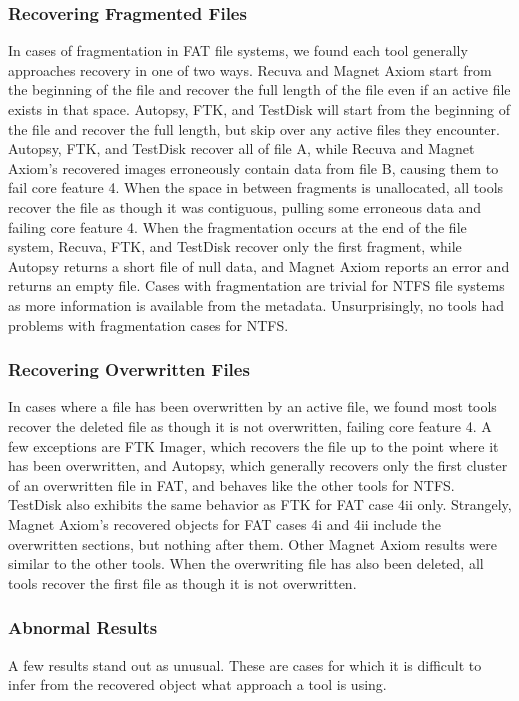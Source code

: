 \subsubsection{Recovering Fragmented Files}
In cases of fragmentation in FAT file systems, we found each tool generally approaches recovery in one of two ways. 
Recuva and Magnet Axiom start from the beginning of the file and recover the full length of the file even if an active file exists in that space. 
Autopsy, FTK, and TestDisk will start from the beginning of the file and recover the full length, but skip over any active files they encounter.
Autopsy, FTK, and TestDisk recover all of file A, while Recuva and Magnet Axiom's recovered images erroneously contain data from file B, causing them to fail core feature 4. 
When the space in between fragments is unallocated, all tools recover the file as though it was contiguous, pulling some erroneous data and failing core feature 4. 
When the fragmentation occurs at the end of the file system, Recuva, FTK, and TestDisk recover only the first fragment, while Autopsy returns a short file of null data, and Magnet Axiom reports an error and returns an empty file.
Cases with fragmentation are trivial for NTFS file systems as more information is available from the metadata. 
Unsurprisingly, no tools had problems with fragmentation cases for NTFS.

\subsubsection{Recovering Overwritten Files}
In cases where a file has been overwritten by an active file, we found most tools recover the deleted file as though it is not overwritten, failing core feature 4. 
A few exceptions are FTK Imager, which recovers the file up to the point where it has been overwritten, and Autopsy, which generally recovers only the first cluster of an overwritten file in FAT, and behaves like the other tools for NTFS. 
TestDisk also exhibits the same behavior as FTK for FAT case 4ii only. 
Strangely, Magnet Axiom's recovered objects for FAT cases 4i and 4ii include the overwritten sections, but nothing after them.
Other Magnet Axiom results were similar to the other tools.
When the overwriting file has also been deleted, all tools recover the first file as though it is not overwritten.

\subsubsection{Abnormal Results}
A few results stand out as unusual.
These are cases for which it is difficult to infer from the recovered object what approach a tool is using.

